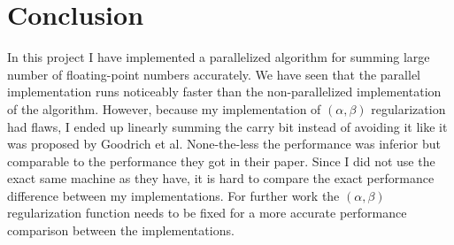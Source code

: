 \documentclass[11pt]{article}       %
\begin{document}
\section{Conclusion} \label{concl}

In this project I have implemented a parallelized algorithm for summing large number of floating-point numbers accurately. We have seen that the parallel implementation runs noticeably faster than the non-parallelized implementation of the algorithm. However, because my implementation of $(\alpha, \beta)$ regularization had flaws, I ended up linearly summing the carry bit instead of avoiding it like it was proposed by Goodrich et al. None-the-less the performance was inferior but comparable to the performance they got in their paper. Since I did not use the exact same machine as they have, it is hard to compare the exact performance difference between my implementations. For further work the $(\alpha, \beta)$ regularization function needs to be fixed for a more accurate performance comparison between the implementations.



\end{document}

